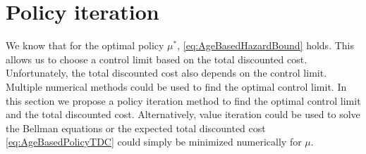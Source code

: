 \section{Policy iteration}\label{section:AgeBasedOptimalPolicyComputation}
We know that for the optimal policy $\mu^*$, \eqref{eq:AgeBasedHazardBound} holds.
This allows us to choose a control limit based on the total discounted cost.
Unfortunately, the total discounted cost also depends on the control limit.
Multiple numerical methods could be used to find the optimal control limit.
In this section we propose a policy iteration method to find the optimal control limit and the total discounted cost.
Alternatively, value iteration could be used to solve the Bellman equations or the expected total discounted cost \eqref{eq:AgeBasedPolicyTDC} could simply be minimized numerically for $\mu$.

